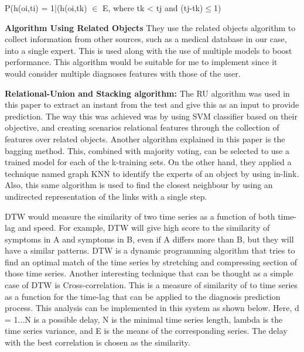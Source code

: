 \documentclass{sig-alternate}
\begin{document}
P(h(oi,ti) = 1|(h(oi,tk) $\in$ E, where tk < tj and (tj-tk)$\leq$1)\newline

\textbf{Algorithm Using Related Objects}\newline
They use the related objects algorithm to collect information from other sources, such as a medical database in our case, into a single expert. This is used along with the use of multiple models to boost performance. This algorithm would be suitable for me to implement since it would consider multiple diagnoses features with those of the user.\newline

\textbf{Relational-Union and Stacking algorithm:}\newline
The RU algorithm was used in this paper to extract an instant from the test and give this as an input to provide prediction. The way this was achieved was by using SVM classifier based on their objective, and creating scenarios relational features through the collection of features over related objects. Another algorithm explained in this paper is the bagging method. This, combined with majority voting, can be selected to use a trained model for each of the k-training sets. On the other hand, they applied a technique named graph KNN to identify the experts of an object by using in-link. Also, this same algorithm is used to find the closest neighbour by using an undirected representation of the links with a single step.\newline

DTW would measure the similarity of two time series as a function of both time-lag and speed. For example, DTW will give high score to the similarity of symptoms in A and symptoms in B, even if A differs more than B, but they will have a similar patterns. DTW is a dynamic programming algorithm that tries to find an optimal match of the time series by stretching and compressing section of those time series. Another interesting technique that can be thought as a simple case of DTW is Cross-correlation. This is a measure of similarity of to time series as a function for the time-lag that can be applied to the diagnosis prediction process. This analysis can be implemented in this system as shown below. Here, d = 1...N is a possible delay, N is the minimal time series length, lambda is the time series variance, and E is the means of the corresponding series. The delay with the best correlation is chosen as the similarity.\newline
\end{document}
